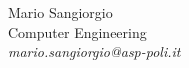 \begin{flushright}


  Mario Sangiorgio\\Computer Engineering\\ \emph{mario.sangiorgio@asp-poli.it} \\ 


\end{flushright}
\begin{center}



\end{center} \clearpage
